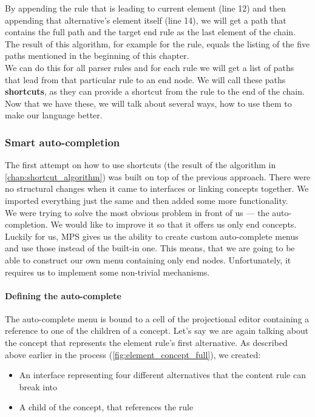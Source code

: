 By appending the rule that is leading to current element (line 12) and then appending that alternative's element itself (line 14), we will get a path that contains the full path and the target end rule as the last element of the chain.
The result of this algorithm, for example for the  rule, equals the listing of the five paths mentioned in the beginning of this chapter.
\\

We can do this for all parser rules and for each rule we will get a list of paths that lead from that particular rule to an end node.
We will call these paths \textbf{shortcuts}, as they can provide a shortcut from the rule to the end of the chain.
Now that we have these, we will talk about several ways, how to use them to make our language better.

\subsubsection{Smart auto-completion}
The first attempt on how to use shortcuts (the result of the algorithm in \ref{chap:shortcut_algorithm}) was built on top of the previous approach.
There were no structural changes when it came to interfaces or linking concepts together.
We imported everything just the same and then added some more functionality.
\\

We were trying to solve the most obvious problem in front of us --- the auto-completion.
We would like to improve it so that it offers us only end concepts.
Luckily for us, MPS gives us the ability to create custom auto-complete menus and use those instead of the built-in one.
This means, that we are going to be able to construct our own menu containing only end nodes.
Unfortunately, it requires us to implement some non-trivial mechanisms.

\paragraph{Defining the auto-complete}

The auto-complete menu is bound to a cell of the projectional editor containing a reference to one of the children of a concept.
Let's say we are again talking about the concept that represents the element rule's first alternative.
As described above earlier in the process (\ref{fig:element_concept_full}), we created:

\begin{itemize}
	\item An interface  representing four different alternatives that the content rule can break into

	\item A child of the  concept, that references the  rule
\end{itemize}

